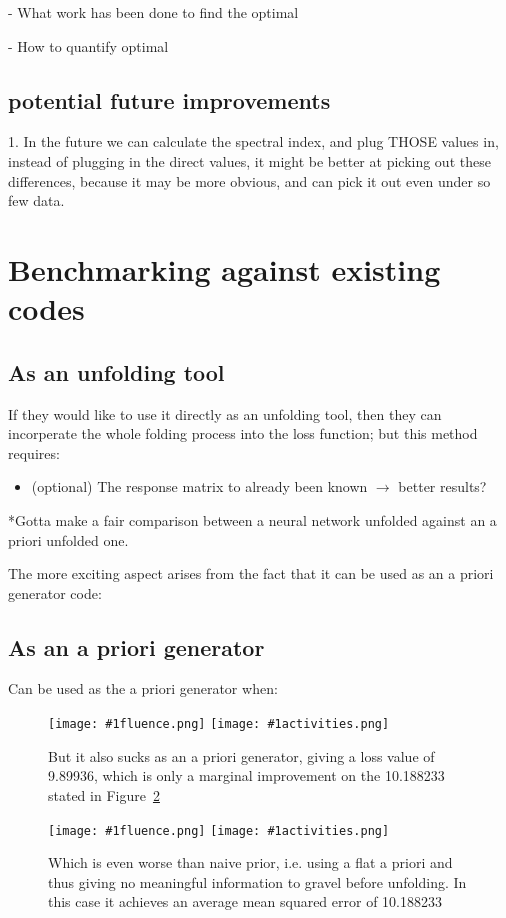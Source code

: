 \documentclass[a4paper, 12pt]{article}
\newcommand{\fluenceandactivities}[1]{
\texttt{[image: \#1fluence.png]}
\texttt{[image: \#1activities.png]}
}
\begin{document}

- What work has been done to find the optimal

- How to quantify optimal

\subsection{potential future improvements}
1. In the future we can calculate the spectral index, and plug THOSE values in, instead of plugging in the direct values, it might be better at picking out these differences, because it may be more obvious, and can pick it out even under so few data.

\section{Benchmarking against existing codes}
\subsection{As an unfolding tool}
If they would like to use it directly as an unfolding tool, then they can incorperate the whole folding process into the loss function; but this method requires:
\begin{itemize}
    \item (optional) The response matrix to already been known $\rightarrow$ better results?
\end{itemize}
*Gotta make a fair comparison between a neural network unfolded against an a priori unfolded one.

The more exciting aspect arises from the fact that it can be used as an a priori generator code:
\subsection{As an a priori generator}
Can be used as the a priori generator when:
\begin{figure}
\centering
\fluenceandactivities{/home/ocean/Documents/GitHubDir/unfolding/unfolding/unfoldingsuite/neuralnetwork/realinputEarlyStopping/comparison/real_fusion_test_gravel_nn_a_priori_test_001_}
\caption{But it also sucks as an a priori generator, giving a loss value of 9.89936, which is only a marginal improvement on the 10.188233 stated in Figure~\ref{gravel_flat_a_priori_JET}}\label{gravel_nn_a_priori_JET}
\end{figure}

\begin{figure}
\centering
\fluenceandactivities{/home/ocean/Documents/GitHubDir/unfolding/unfolding/unfoldingsuite/neuralnetwork/realinputEarlyStopping/comparison/real_fusion_test_gravel_test_001_}
\caption{Which is even worse than naive prior, i.e. using a flat a priori and thus giving no meaningful information to gravel before unfolding. In this case it achieves an average mean squared error of 10.188233}\label{gravel_flat_a_priori_JET}
\end{figure}
\end{document}
